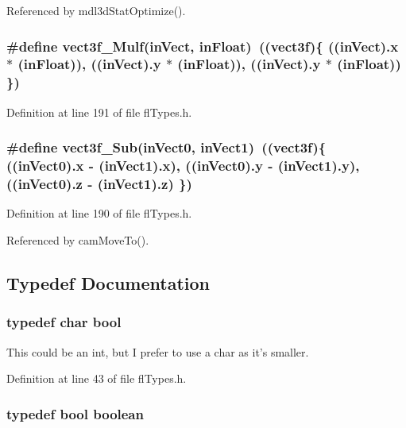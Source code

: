 Referenced by mdl3d\-Stat\-Optimize().
\subsubsection{\setlength{\rightskip}{0pt plus 5cm}\#define vect3f\_\-Mulf(in\-Vect, in\-Float)~(({\bf vect3f})\{ ((in\-Vect).x $\ast$ (in\-Float)), ((in\-Vect).y $\ast$ (in\-Float)), ((in\-Vect).y $\ast$ (in\-Float)) \})}\label{flTypes_8h_bbfdd6b9abb18c8ae319a1b633e7473a}




Definition at line 191 of file fl\-Types.h.
\subsubsection{\setlength{\rightskip}{0pt plus 5cm}\#define vect3f\_\-Sub(in\-Vect0, in\-Vect1)~(({\bf vect3f})\{ ((in\-Vect0).x - (in\-Vect1).x), ((in\-Vect0).y - (in\-Vect1).y), ((in\-Vect0).z - (in\-Vect1).z) \})}\label{flTypes_8h_1807c5909484b46dbeec2894f8463609}




Definition at line 190 of file fl\-Types.h.

Referenced by cam\-Move\-To().

\subsection{Typedef Documentation}
\subsubsection{\setlength{\rightskip}{0pt plus 5cm}typedef char {\bf bool}}\label{flTypes_8h_d5c9d4ba3dc37783a528b0925dc981a0}


This could be an int, but I prefer to use a char as it's smaller. 



Definition at line 43 of file fl\-Types.h.
\subsubsection{\setlength{\rightskip}{0pt plus 5cm}typedef {\bf bool} {\bf boolean}}\label{flTypes_8h_f29b166bf5fea7f0bbc07f7014a8c6b5}




